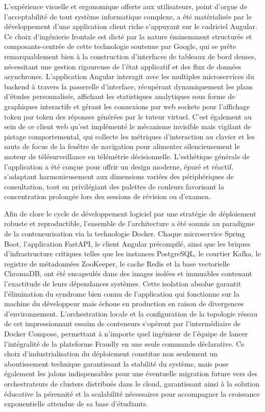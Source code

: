 L'expérience visuelle et ergonomique offerte aux utilisateurs, point d'orgue de l'acceptabilité de tout système informatique complexe, a été matérialisée par le développement d'une application client riche s'appuyant sur le cadriciel Angular. Ce choix d'ingénierie frontale est dicté par la nature éminemment structurée et composants-centrée de cette technologie soutenue par Google, qui se prête remarquablement bien à la construction d'interfaces de tableaux de bord denses, nécessitant une gestion rigoureuse de l'état applicatif et des flux de données asynchrones. L'application Angular interagit avec les multiples microservices du backend à travers la passerelle d'interface, récupérant dynamiquement les plans d'études personnalisés, affichant les statistiques analytiques sous forme de graphiques interactifs et gérant les connexions par web sockets pour l'affichage token par token des réponses générées par le tuteur virtuel. C'est également au sein de ce client web qu'est implémenté le mécanisme invisible mais vigilant de pistage comportemental, qui collecte les métriques d'interaction au clavier et les sauts de focus de la fenêtre de navigation pour alimenter silencieusement le moteur de télésurveillance en télémétrie décisionnelle. L'esthétique générale de l'application a été conçue pour offrir un design moderne, épuré et réactif, s'adaptant harmonieusement aux dimensions variées des périphériques de consultation, tout en privilégiant des palettes de couleurs favorisant la concentration prolongée lors des sessions de révision ou d'examen.

Afin de clore le cycle de développement logiciel par une stratégie de déploiement robuste et reproductible, l'ensemble de l'architecture a été soumis au paradigme de la conteneurisation via la technologie Docker. Chaque microservice Spring Boot, l'application FastAPI, le client Angular précompilé, ainsi que les briques d'infrastructure critiques telles que les instances PostgreSQL, le courtier Kafka, le registre de métadonnées ZooKeeper, le cache Redis et la base vectorielle ChromaDB, ont été encapsulés dans des images isolées et immuables contenant l'exactitude de leurs dépendances systèmes. Cette isolation absolue garantit l'élimination du syndrome bien connu de l'application qui fonctionne sur la machine du développeur mais échoue en production en raison de divergences d'environnement. L'orchestration locale et la configuration de la topologie réseau de cet impressionnant essaim de conteneurs s'opèrent par l'intermédiaire de Docker Compose, permettant à n'importe quel ingénieur de l'équipe de lancer l'intégralité de la plateforme Fraudly en une seule commande déclarative. Ce choix d'industrialisation du déploiement constitue non seulement un aboutissement technique garantissant la stabilité du système, mais pose également les jalons indispensables pour une éventuelle migration future vers des orchestrateurs de clusters distribués dans le cloud, garantissant ainsi à la solution éducative la pérennité et la scalabilité nécessaires pour accompagner la croissance exponentielle attendue de sa base d'étudiants.
